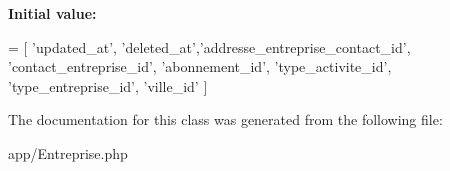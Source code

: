 {\bfseries Initial value\+:}
\begin{DoxyCode}
= [
        \textcolor{stringliteral}{'updated\_at'}, \textcolor{stringliteral}{'deleted\_at'},\textcolor{stringliteral}{'addresse\_entreprise\_contact\_id'},
        \textcolor{stringliteral}{'contact\_entreprise\_id'}, \textcolor{stringliteral}{'abonnement\_id'}, \textcolor{stringliteral}{'type\_activite\_id'},
        \textcolor{stringliteral}{'type\_entreprise\_id'}, \textcolor{stringliteral}{'ville\_id'}
    ]
\end{DoxyCode}


The documentation for this class was generated from the following file\+:\begin{DoxyCompactItemize}
\item 
app/Entreprise.\+php\end{DoxyCompactItemize}
